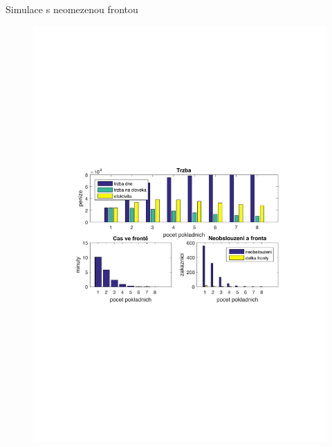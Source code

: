 \begin{frame}{Simulace s neomezenou frontou}
	\begin{figure}
	\includegraphics[width=0.99\columnwidth]{imgs/timeout.pdf}
	\end{figure}
\end{frame}
